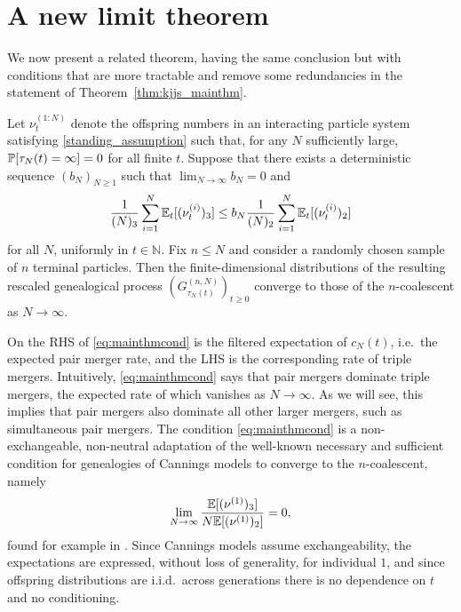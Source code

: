 \section{A new limit theorem}
We now present a related theorem, having the same conclusion but with conditions that are more tractable and remove some redundancies in the statement of Theorem~\ref{thm:kjjs_mainthm}. 

\begin{theorem}\label{thm:FDDconv}
Let $\nu_t^{(1:N)}$ denote the offspring numbers in an interacting particle system satisfying \ref{standing_assumption} such that, for any $N$ sufficiently large, $\mathbb{P}[ \tau_N(t) = \infty ] =0$ for all finite $t$. Suppose that there exists a deterministic sequence $(b_N)_{N\geq1}$ such that ${\lim}_{N\to\infty} b_N =0$ and
\begin{equation}\label{eq:mainthmcond}
\frac{1}{(N)_3} \sum_{i = 1}^N \mathbb{E}_t[ (\nu_t^{(i)})_3 ]  \leq b_N \frac{1}{(N)_2} \sum_{i = 1}^N \mathbb{E}_t[ (\nu_t^{(i)})_2 ]
\end{equation}
for all $N$, uniformly in $t \in \mathbb{N}$.
Fix $n\leq N$ and consider a randomly chosen sample of $n$ terminal particles.
Then the finite-dimensional distributions of the resulting rescaled genealogical process $(G_{\tau_N(t)}^{(n,N)})_{t\geq0}$ converge to those of the $n$-coalescent as $N \to \infty$.
\end{theorem}

On the RHS of \eqref{eq:mainthmcond} is the filtered expectation of $c_N(t)$, i.e.\ the expected pair merger rate, and the LHS is the corresponding rate of triple mergers. Intuitively, \eqref{eq:mainthmcond} says that pair mergers dominate triple mergers, the expected rate of which vanishes as $N\to\infty$. As we will see, this implies that pair mergers also dominate all other larger mergers, such as simultaneous pair mergers.
The condition \eqref{eq:mainthmcond} is a non-exchangeable, non-neutral adaptation of the well-known necessary and sufficient condition for genealogies of Cannings models to converge to the $n$-coalescent, namely
\begin{equation}
\lim_{N\to\infty} \frac{\mathbb{E}[(\nu^{(1)})_3]}{N \mathbb{E}[(\nu^{(1)})_2]} =0 ,
\end{equation}
found for example in \textcite[Equation (16)]{mohle2000}.
Since Cannings models assume exchangeability, the expectations are expressed, without loss of generality, for individual $1$, and since offspring distributions are i.i.d.\ across generations there is no dependence on $t$ and no conditioning.

